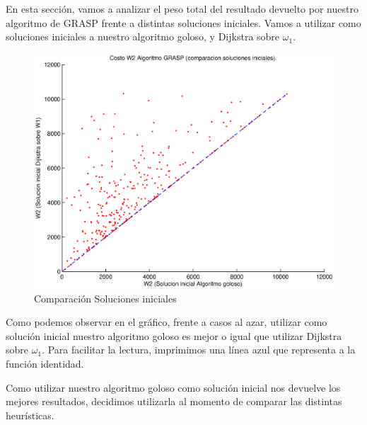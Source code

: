 En esta sección, vamos a analizar el peso total del resultado devuelto por nuestro algoritmo de GRASP frente a distintas soluciones iniciales. Vamos a utilizar como soluciones iniciales a nuestro algoritmo goloso, y Dijkstra sobre $\omega_1$.

\begin{figure}[H]
  \begin{center}
    \begin{minipage}{0.7\linewidth}
      \includegraphics[width=\linewidth]{graficos/grasp_comparacion_soluciones_iniciales.eps}
      \caption{Comparación Soluciones iniciales}\label{fig:grasp-proporcion}
    \end{minipage}
  \end{center}
\end{figure}

Como podemos observar en el gráfico, frente a casos al azar, utilizar como solución inicial nuestro algoritmo goloso es mejor o igual que utilizar Dijkstra sobre $\omega_1$. Para facilitar la lectura, imprimimos una línea azul que representa a la función identidad.

Como utilizar nuestro algoritmo goloso como solución inicial nos devuelve los mejores resultados, decidimos utilizarla al momento de comparar las distintas heurísticas.